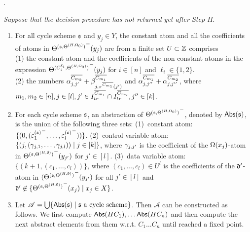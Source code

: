 \begin{appendix}
.
{\it 
Suppose that the decision procedure has not returned yet after Step II. 
\begin{enumerate}
\item For all cycle scheme ${\mathfrak{s} }$ and $y_j \in Y$, the constant atom and all the coefficients of atoms in ${\Theta^{({\mathfrak{s} }, \Theta^{(H,\Omega_0)})}}^-(y_j)$ are from a finite set $U \subset {\mathbb{Z} }$ comprises\\ (1)
the constant atom and the coefficients of the non-constant atoms in the expression ${\Theta^{(C^{\ell_i}_{i}, \Theta^{(H,\Omega_0)})}}^-(y_j)$ for $i\in [n]$ and $\ell_i \in \{1,2\}$.\smallskip\\(2) the numbers $\alpha^{\overline{C_{m_2}}}_{j,j'} + \beta^{\overline{C_{m_1}}}_{j,\pi^{\overline{C_{m_1}}}(j')}$ and $\alpha^{\overline{C_{m_1}}}_{j, j''} + \alpha^{\overline{C_{m_2}}}_{j,j''}$, where  $m_1,m_2 \in [n], j\in[l],j' \in I^{\overline{C_{m_1}}}_{tr} \cap I^{\overline{C_{m_2}}}_{tr},  j'' \in [k]$. 

\item For each cycle scheme ${\mathfrak{s} }$, an abstraction of ${\Theta^{({\mathfrak{s} }, \Theta^{(H,\Omega_0)})}}^-$, denoted by $\mathsf{Abs}({\mathfrak{s} })$,  is the union of the following three sets:
(1)~constant atom: $\{(0, ( {\varepsilon^{({\mathfrak{s} })}_{1}}^-,\dots, {\varepsilon^{({\mathfrak{s} })}_l}^-))\}$. (2)~control variable atom: $\{(j, (\gamma_{j,1},\dots, \gamma_{j,l})) \mid j \in [k]\}$, where $\gamma_{j, j'}$ is the coefficient of the $\Omega(x_j)$-atom in ${\Theta^{({\mathfrak{s} },\Theta^{(H,\emptyset)})}}^-(y_{j'})$ for $j'\in[l]$. (3)~data variable atom: $\{(k+1, (c_1,\dots,c_l))\}$, where $(c_1,\dots,c_l) \in U^l$ is the coefficients of the $\mathfrak{d}'$-atom in ${(\Theta^{({\mathfrak{s} },\Theta^{(H,\emptyset)})}}^-(y_{j'})$ for all $j' \in [l]$ and $\mathfrak{d}'\not\in \{{\Theta^{({\mathfrak{s} },\Theta^{(H,\emptyset)})}}^-(x_j)\mid x_j\in X\}$.
\item Let $\mathscr{A}=\bigcup \{\mathsf{Abs}({\mathfrak{s} }) \mid {\mathfrak{s} } \mbox{ a cycle scheme}\}$. Then $\mathscr{A}$ can be constructed as follows. We first compute $\mathsf{Abs}(HC_1), \ldots \mathsf{Abs}(HC_n)$ and then compute the next abstract elements from them w.r.t. $C_1\ldots C_n$ until reached a fixed point.
\end{enumerate}
}








\end{appendix}
